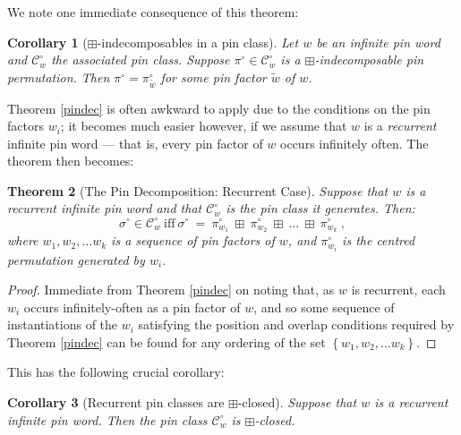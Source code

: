 \documentclass[11pt,a4paper]{article}
\newtheorem{thm}{Theorem}[section]
\newtheorem{cor}[thm]{Corollary}
\theoremstyle{definition}
\newtheorem{comment}[thm]{Comment}
\newcommand{\CCC}{\mathcal{C}}
\let\C\CCC
\begin{document}
We note one immediate consequence of this theorem:

\begin{cor}[$\boxplus$-indecomposables in a pin class] \label{pinfactorsareindecs}
Let $w$ be an infinite pin word and $\C_{w}^{\circ}$ the associated pin class. Suppose $\pi^{\circ} \in \C_{w}^{\circ}$ is a $\boxplus$-indecomposable pin permutation. Then $\pi^{\circ} = \pi_{\widetilde{w}}^{\circ}$ for some pin factor $\widetilde{w}$ of $w$.
\end{cor}

Theorem \ref{pindec} is often awkward to apply due to the conditions on the pin factors $w_{i}$; it becomes much easier however, if we assume that $w$ is a \emph{recurrent} infinite pin word --- that is, every pin factor of $w$ occurs infinitely often. The theorem then becomes:

\begin{thm}[The Pin Decomposition: Recurrent Case]
Suppose that $w$ is a recurrent infinite pin word and that $\C_{w}^{\circ}$ is the pin class it generates. Then:
\[
\sigma^{\circ} \in \C_{w}^{\circ} \ \text{iff} \ \sigma^{\circ} \ = \ \pi_{w_{1}}^{\circ} \ \boxplus \ \pi_{w_{2}}^{\circ} \ \boxplus \ \dots \ \boxplus \ \pi_{w_{k}}^{\circ} \ ,
\]
where $w_{1}, w_{2}, \dots w_{k}$ is a sequence of pin factors of $w$, and $\pi_{w_{i}}^{\circ}$ is the centred permutation generated by $w_{i}$.
\end{thm}

\begin{proof}
Immediate from Theorem \ref{pindec} on noting that, as $w$ is recurrent, each $w_{i}$ occurs infinitely-often as a pin factor of $w$, and so some sequence of instantiations of the $w_{i}$ satisfying the position and overlap conditions required by Theorem \ref{pindec} can be found for any ordering of the set $\left\{w_{1}, w_{2}, \dots w_{k}\right\}$. \qedhere
\end{proof}

This has the following crucial corollary:

\begin{cor}[Recurrent pin classes are $\boxplus$-closed]\label{recbox}
Suppose that $w$ is a recurrent infinite pin word. Then the pin class $\mathcal{C}^{\circ}_{w}$ is $\boxplus$-closed.
\end{cor}

\end{document}
